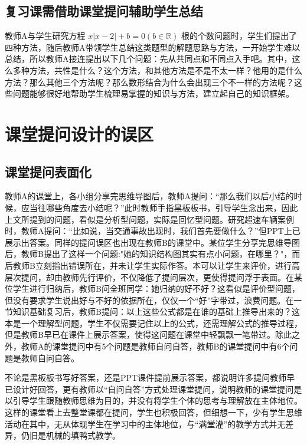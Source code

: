 \subsection{复习课需借助课堂提问辅助学生总结}

教师A与学生研究方程 $x |x - 2| + b = 0 (b \in \mathbb{R})$ 根的个数问题时，学生们提出了四种方法，随后教师A带领学生总结这类题型的解题思路与方法，一开始学生难以总结，所以教师A接连提出以下几个问题：先从共同点和不同点入手吧。其中，这么多种方法，共性是什么？这个方法，和其他方法是不是不太一样？他用的是什么方法？那么其他三个方法呢？那么数形结合为什么会出现三个不一样的方法呢？这些问题能够很好地帮助学生梳理易掌握的知识与方法，建立起自己的知识框架。



\section{课堂提问设计的误区}

\subsection{课堂提问表面化}

教师A的课堂上，各小组分享完思维导图后，教师A提问：“那么我们以后小结的时候，应当往哪些角度去小结呢？”此时教师手指黑板板书，引导学生念出来，因此上文所提到的问题，看似是分析型问题，实际是回忆型问题。研究超速车辆案例时，教师A提问：“比如说，当交通事故出现时，我们首先要做什么？”但PPT上已展示出答案。同样的提问误区也出现在教师B的课堂中。某位学生分享完思维导图后，教师B提出了这样一个问题:"她的知识结构图其实有点小问题，在哪里？"，而后教师B立刻指出错误所在，并未让学生实际作答。本可以让学生来评价，进行高层次提问，却由教师先行评价，不仅降低了提问层次，更使得提问浮于表面。在某位学生进行归纳后，教师B问全班同学：她归纳的好不好？这看似是评价型问题，但没有要求学生说出好与不好的依据所在，仅仅一个“好”字带过，浪费问题。在一节知识基础复习后，教师B提问：以上这些公式都是在谁的基础上推导出来的？这本是一个理解型问题，学生不仅需要记住以上的公式，还需理解公式的推导过程，但是教师B早已在课件上展示答案，使得这问题在课堂中轻飘飘一笔带过。除此之外，教师A的课堂提问中有5个问题是教师自问自答，教师B的课堂提问中有6个问题是教师自问自答。

不论是黑板板书写好答案，还是PPT课件提前展示答案，都说明许多提问教师早已设计好回答，更有教师以“自问自答”方式处理课堂提问，说明教师的课堂提问是以引导学生跟随教师思维为目的，并没有将学生个体的思考与理解放在主体地位。这样的课堂看上去整堂课都在提问，学生也积极回答，但细想一下，少有学生思维活动在其中，无从体现学生在学习中的主体地位，与“满堂灌”的教学方式并无差异，仍旧是机械的填鸭式教学。


